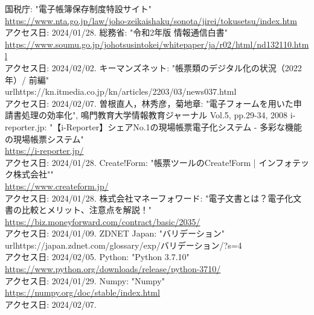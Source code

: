 \documentclass[uplatex, report, a4j, 10pt]{jsbook}
\begin{document}
\begin{thebibliography}{0}
  国税庁: "電子帳簿保存制度特設サイト"\\\url{https://www.nta.go.jp/law/joho-zeikaishaku/sonota/jirei/tokusetsu/index.htm}\\アクセス日: 2024/01/28.
  総務省: "令和2年版 情報通信白書"\\\url{https://www.soumu.go.jp/johotsusintokei/whitepaper/ja/r02/html/nd132110.html}\\アクセス日: 2024/02/02.
  キーマンズネット: "帳票類のデジタル化の状況（2022年）/ 前編"\\url{https://kn.itmedia.co.jp/kn/articles/2203/03/news037.html}\\アクセス日: 2024/02/07.
  曽根直人，林秀彦，菊地章: "電子フォームを用いた申請書処理の効率化", 鳴門教育大学情報教育ジャーナル Vol.5, pp.29-34, 2008
  i-reporter.jp: "【i-Reporter】シェアNo.1の現場帳票電子化システム - 多彩な機能の現場帳票システム"\\\url{https://i-reporter.jp/}\\アクセス日: 2024/01/28.
  Create!Form: "帳票ツールのCreate!Form | インフォテック株式会社""\\\url{https://www.createform.jp/}\\アクセス日: 2024/01/28.
  株式会社マネーフォワード: "電子文書とは？電子化文書の比較とメリット、注意点を解説！"\\\url{https://biz.moneyforward.com/contract/basic/2035/}\\アクセス日: 2024/01/09.
  ZDNET Japan: "バリデーション"\\url{https://japan.zdnet.com/glossary/exp/バリデーション/?s=4}\\アクセス日: 2024/02/05.
  Python: "Python 3.7.10"\\\url{https://www.python.org/downloads/release/python-3710/}\\アクセス日: 2024/01/29.
  Numpy: "Numpy"\\\url{https://numpy.org/doc/stable/index.html}\\アクセス日: 2024/02/07.

\end{thebibliography}
\end{document}
